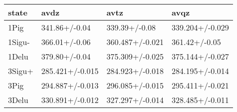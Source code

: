 \begin{tabular}{llll}
\toprule
state & avdz & avtz & avqz \\
\midrule
1Pig & 341.86+/-0.04 & 339.39+/-0.08 & 339.204+/-0.029 \\
1Sigu- & 366.01+/-0.06 & 360.487+/-0.021 & 361.42+/-0.05 \\
1Delu & 379.80+/-0.04 & 375.309+/-0.025 & 375.144+/-0.027 \\
3Sigu+ & 285.421+/-0.015 & 284.923+/-0.018 & 284.195+/-0.014 \\
3Pig & 294.887+/-0.013 & 296.085+/-0.015 & 295.411+/-0.021 \\
3Delu & 330.891+/-0.012 & 327.297+/-0.014 & 328.485+/-0.011 \\
\bottomrule
\end{tabular}
